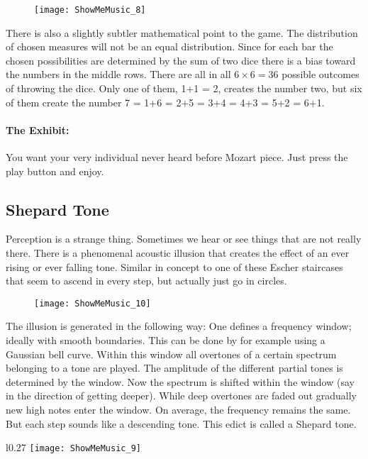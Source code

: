 \begin{figure}[!b]
\centering
\texttt{[image: ShowMeMusic\_8]}
\end{figure}

There is also a slightly subtler mathematical point to the game. The distribution of chosen measures will not be an equal distribution. Since for each bar the chosen possibilities are determined by the sum of two dice there is a bias toward the numbers in the middle rows. There are all in all $6\times 6=36$ possible outcomes of throwing the dice. Only one of them, 1+1 = 2, creates the number two, but six of them create the number 7 = 1+6 = 2+5 = 3+4 = 4+3 = 5+2 = 6+1.  

\paragraph{The Exhibit:} You want your very individual never heard before Mozart piece. Just press the play button and enjoy.

\subsection{Shepard Tone}
Perception is a strange thing. Sometimes we hear or see things that are not really there. There is a phenomenal acoustic illusion that creates the effect of an ever rising or ever falling tone. Similar in concept to one of these Escher staircases that seem to ascend in every step, but actually just go in circles.

\begin{figure}[h]
\centering
\texttt{[image: ShowMeMusic\_10]}
\end{figure}

The illusion is generated in the following way: One defines a frequency window; ideally with smooth boundaries. This can be done by for example using a Gaussian bell curve. Within this window all overtones of a certain spectrum belonging to a tone are played. The amplitude of the different partial tones is determined by the window. Now the spectrum is shifted within the window (say in the direction of getting deeper). While deep overtones are faded out gradually new high notes enter the window. On average, the frequency remains the same. But each step sounds like a descending tone. This edict is called a Shepard tone.

\begin{wrapfigure}[30]{l}{0.27\textwidth}
\centering
\texttt{[image: ShowMeMusic\_9]}
\end{wrapfigure}
